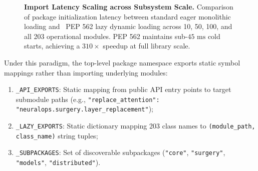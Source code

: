 \begin{figure}[t]
{%
}
\caption[Import Latency Scaling across Subsystem Scale]{\textbf{Import Latency Scaling across Subsystem Scale.} Comparison of package initialization latency between standard eager monolithic loading and \neuralops\ PEP 562 lazy dynamic loading across 10, 50, 100, and all 203 operational modules. PEP 562 maintains sub-$45\text{ ms}$ cold starts, achieving a $310\times$ speedup at full library scale.}
\label{fig:pep562_scaling}
\end{figure}

Under this paradigm, the top-level package namespace exports static symbol mappings rather than importing underlying modules:
\begin{enumerate}
    \item \texttt{\_API\_EXPORTS}: Static mapping from public API entry points to target submodule paths (e.g., \texttt{"replace\_attention": "neuralops.surgery.layer\_replacement"});
    \item \texttt{\_LAZY\_EXPORTS}: Static dictionary mapping 203 class names to \texttt{(module\_path, class\_name)} string tuples;
    \item \texttt{\_SUBPACKAGES}: Set of discoverable subpackages (\texttt{"core"}, \texttt{"surgery"}, \linebreak \texttt{"models"}, \texttt{"distributed"}).
\end{enumerate}

